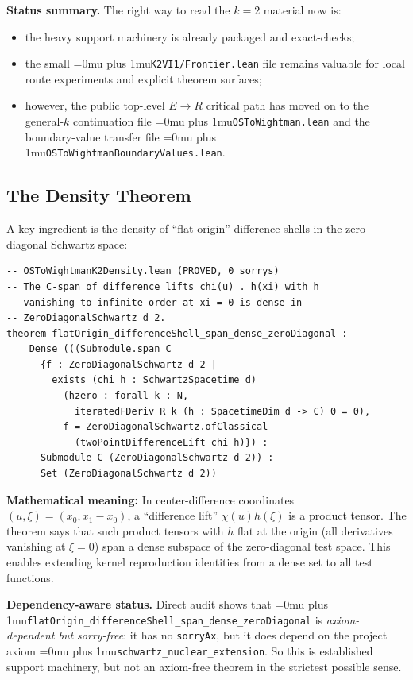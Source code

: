 \documentclass[11pt,a4paper]{article}
\newcommand{\leanfile}[1]{\begingroup\Urlmuskip=0mu plus 1mu\relax\nolinkurl{#1}\endgroup}
\newcommand{\leanname}[1]{\begingroup\Urlmuskip=0mu plus 1mu\relax\nolinkurl{#1}\endgroup}
\begin{document}
\medskip\noindent
\textbf{Status summary.}
The right way to read the $k=2$ material now is:
\begin{itemize}
\item the heavy support machinery is already packaged and exact-checks;
\item the small \leanfile{K2VI1/Frontier.lean} file remains valuable for local
  route experiments and explicit theorem surfaces;
\item however, the public top-level $E \to R$ critical path has moved on to the
  general-$k$ continuation file \leanfile{OSToWightman.lean} and the
  boundary-value transfer file \leanfile{OSToWightmanBoundaryValues.lean}.
\end{itemize}

\subsection{The Density Theorem}

A key ingredient is the density of ``flat-origin'' difference shells in
the zero-diagonal Schwartz space:

\begin{lstlisting}
-- OSToWightmanK2Density.lean (PROVED, 0 sorrys)
-- The C-span of difference lifts chi(u) . h(xi) with h
-- vanishing to infinite order at xi = 0 is dense in
-- ZeroDiagonalSchwartz d 2.
theorem flatOrigin_differenceShell_span_dense_zeroDiagonal :
    Dense (((Submodule.span C
      {f : ZeroDiagonalSchwartz d 2 |
        exists (chi h : SchwartzSpacetime d)
          (hzero : forall k : N,
            iteratedFDeriv R k (h : SpacetimeDim d -> C) 0 = 0),
          f = ZeroDiagonalSchwartz.ofClassical
            (twoPointDifferenceLift chi h)}) :
      Submodule C (ZeroDiagonalSchwartz d 2)) :
      Set (ZeroDiagonalSchwartz d 2))
\end{lstlisting}

\noindent\textbf{Mathematical meaning:} In center-difference coordinates
$(u, \xi) = (x_0, x_1 - x_0)$, a ``difference lift'' $\chi(u) h(\xi)$ is
a product tensor. The theorem says that such product tensors with $h$ flat
at the origin (all derivatives vanishing at $\xi = 0$) span a dense subspace
of the zero-diagonal test space. This enables extending kernel reproduction
identities from a dense set to all test functions.

\medskip\noindent
\textbf{Dependency-aware status.}
Direct audit shows that
\leanname{flatOrigin\_differenceShell\_span\_dense\_zeroDiagonal} is
\emph{axiom-dependent but sorry-free}: it has no \texttt{sorryAx}, but it does
depend on the project axiom \leanname{schwartz\_nuclear\_extension}. So this is
established support machinery, but not an axiom-free theorem in the strictest
possible sense.
\end{document}
